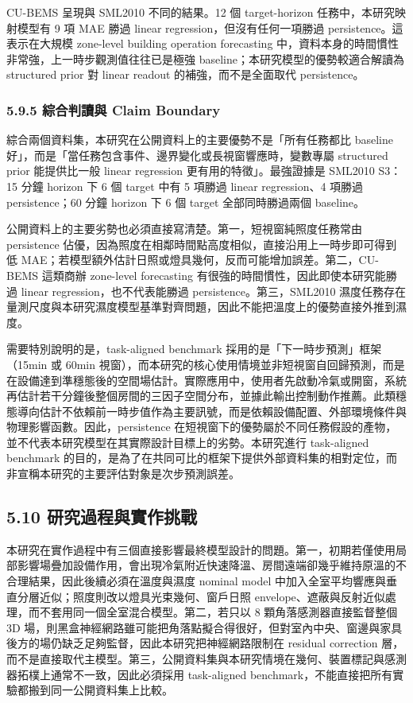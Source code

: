 \documentclass[12pt,a4paper]{article}
\begin{document}
CU-BEMS 呈現與 SML2010 不同的結果。12 個 target-horizon 任務中，本研究映射模型有 9 項 MAE 勝過 linear regression，但沒有任何一項勝過 persistence。這表示在大規模 zone-level building operation forecasting 中，資料本身的時間慣性非常強，上一時步觀測值往往已是極強 baseline；本研究模型的優勢較適合解讀為 structured prior 對 linear readout 的補強，而不是全面取代 persistence。


\subsubsection*{5.9.5 綜合判讀與 Claim Boundary}

綜合兩個資料集，本研究在公開資料上的主要優勢不是「所有任務都比 baseline 好」，而是「當任務包含事件、邊界變化或長視窗響應時，變數專屬 structured prior 能提供比一般 linear regression 更有用的特徵」。最強證據是 SML2010 S3：15 分鐘 horizon 下 6 個 target 中有 5 項勝過 linear regression、4 項勝過 persistence；60 分鐘 horizon 下 6 個 target 全部同時勝過兩個 baseline。


公開資料上的主要劣勢也必須直接寫清楚。第一，短視窗純照度任務常由 persistence 佔優，因為照度在相鄰時間點高度相似，直接沿用上一時步即可得到低 MAE；若模型額外估計日照或燈具幾何，反而可能增加誤差。第二，CU-BEMS 這類商辦 zone-level forecasting 有很強的時間慣性，因此即使本研究能勝過 linear regression，也不代表能勝過 persistence。第三，SML2010 濕度任務存在量測尺度與本研究濕度模型基準對齊問題，因此不能把溫度上的優勢直接外推到濕度。


需要特別說明的是，task-aligned benchmark 採用的是「下一時步預測」框架（15min 或 60min 視窗），而本研究的核心使用情境並非短視窗自回歸預測，而是在設備達到準穩態後的空間場估計。實際應用中，使用者先啟動冷氣或開窗，系統再估計若干分鐘後整個房間的三因子空間分布，並據此輸出控制動作推薦。此類穩態導向估計不依賴前一時步值作為主要訊號，而是依賴設備配置、外部環境條件與物理影響函數。因此，persistence 在短視窗下的優勢屬於不同任務假設的產物，並不代表本研究模型在其實際設計目標上的劣勢。本研究進行 task-aligned benchmark 的目的，是為了在共同可比的框架下提供外部資料集的相對定位，而非宣稱本研究的主要評估對象是次步預測誤差。


\subsection*{5.10 研究過程與實作挑戰}

本研究在實作過程中有三個直接影響最終模型設計的問題。第一，初期若僅使用局部影響場疊加設備作用，會出現冷氣附近快速降溫、房間遠端卻幾乎維持原溫的不合理結果，因此後續必須在溫度與濕度 nominal model 中加入全室平均響應與垂直分層近似；照度則改以燈具光束幾何、窗戶日照 envelope、遮蔽與反射近似處理，而不套用同一個全室混合模型。第二，若只以 8 顆角落感測器直接監督整個 3D 場，則黑盒神經網路雖可能把角落點擬合得很好，但對室內中央、窗邊與家具後方的場仍缺乏足夠監督，因此本研究把神經網路限制在 residual correction 層，而不是直接取代主模型。第三，公開資料集與本研究情境在幾何、裝置標記與感測器拓樸上通常不一致，因此必須採用 task-aligned benchmark，不能直接把所有實驗都搬到同一公開資料集上比較。
\end{document}
